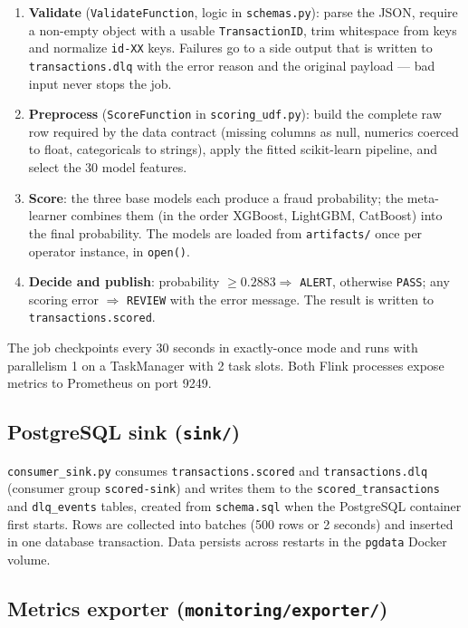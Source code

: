 \documentclass[11pt,a4paper]{article}
\newcommand{\code}[1]{\texttt{#1}}
\begin{document}
\begin{enumerate}
  \item \textbf{Validate} (\code{ValidateFunction}, logic in
  \code{schemas.py}): parse the JSON, require a non-empty object with a usable
  \code{TransactionID}, trim whitespace from keys and normalize \code{id-XX}
  keys. Failures go to a side output that is written to
  \code{transactions.dlq} with the error reason and the original payload ---
  bad input never stops the job.
  \item \textbf{Preprocess} (\code{ScoreFunction} in \code{scoring\_udf.py}):
  build the complete raw row required by the data contract (missing columns as
  null, numerics coerced to float, categoricals to strings), apply the fitted
  scikit-learn pipeline, and select the 30 model features.
  \item \textbf{Score}: the three base models each produce a fraud
  probability; the meta-learner combines them (in the order XGBoost, LightGBM,
  CatBoost) into the final probability. The models are loaded from
  \code{artifacts/} once per operator instance, in \code{open()}.
  \item \textbf{Decide and publish}: probability $\geq 0.2883 \Rightarrow$
  \code{ALERT}, otherwise \code{PASS}; any scoring error $\Rightarrow$
  \code{REVIEW} with the error message. The result is written to
  \code{transactions.scored}.
\end{enumerate}

The job checkpoints every 30 seconds in exactly-once mode and runs with
parallelism 1 on a TaskManager with 2 task slots. Both Flink processes expose
metrics to Prometheus on port 9249.

\subsection{PostgreSQL sink (\code{sink/})}

\code{consumer\_sink.py} consumes \code{transactions.scored} and
\code{transactions.dlq} (consumer group \code{scored-sink}) and writes them to
the \code{scored\_transactions} and \code{dlq\_events} tables, created from
\code{schema.sql} when the PostgreSQL container first starts. Rows are
collected into batches (500 rows or 2 seconds) and inserted in one database
transaction. Data persists across restarts in the \code{pgdata} Docker volume.

\subsection{Metrics exporter (\code{monitoring/exporter/})}
\end{document}
